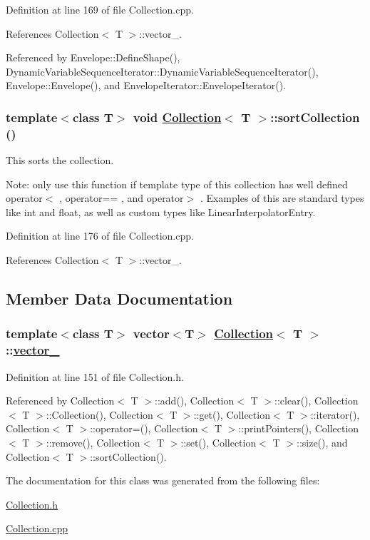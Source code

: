 Definition at line 169 of file Collection.cpp.

References Collection$<$ T $>$::vector\_\-.

Referenced by Envelope::Define\-Shape(), Dynamic\-Variable\-Sequence\-Iterator::Dynamic\-Variable\-Sequence\-Iterator(), Envelope::Envelope(), and Envelope\-Iterator::Envelope\-Iterator().\hypertarget{classCollection_a11}{
\subsubsection[sortCollection]{\setlength{\rightskip}{0pt plus 5cm}template$<$class T$>$ void \hyperlink{classCollection}{Collection}$<$ T $>$::sort\-Collection ()}}
\label{classCollection_a11}


This sorts the collection. \begin{Desc}
\item[Note:]only use this function if template type of this collection has well defined operator$<$ , operator== , and operator$>$ . Examples of this are standard types like int and float, as well as custom types like Linear\-Interpolator\-Entry. \end{Desc}


Definition at line 176 of file Collection.cpp.

References Collection$<$ T $>$::vector\_\-.

\subsection{Member Data Documentation}
\hypertarget{classCollection_r0}{
\subsubsection[vector\_\-]{\setlength{\rightskip}{0pt plus 5cm}template$<$class T$>$ vector$<$T$>$ \hyperlink{classCollection}{Collection}$<$ T $>$::\hyperlink{classCollection_r0}{vector\_\-}}}
\label{classCollection_r0}




Definition at line 151 of file Collection.h.

Referenced by Collection$<$ T $>$::add(), Collection$<$ T $>$::clear(), Collection$<$ T $>$::Collection(), Collection$<$ T $>$::get(), Collection$<$ T $>$::iterator(), Collection$<$ T $>$::operator=(), Collection$<$ T $>$::print\-Pointers(), Collection$<$ T $>$::remove(), Collection$<$ T $>$::set(), Collection$<$ T $>$::size(), and Collection$<$ T $>$::sort\-Collection().

The documentation for this class was generated from the following files:\begin{CompactItemize}
\item 
\hyperlink{Collection_8h}{Collection.h}\item 
\hyperlink{Collection_8cpp}{Collection.cpp}\end{CompactItemize}
